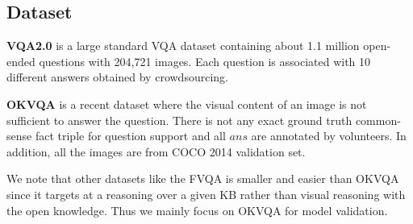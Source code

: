 \documentclass[sigconf]{acmart}
\newcommand{\cjy}[1]{{\color{black}#1}}
\begin{document}
\subsection{Dataset}

\noindent\textbf{VQA2.0}
\citep{antol2015vqa} is a large standard VQA dataset containing about 1.1 million open-ended questions with 204,721 images. Each question is associated with 10 different answers obtained by \cjy{crowdsourcing}.

\noindent\textbf{OKVQA}
\cite{DBLP:conf/cvpr/MarinoRFM19} is a recent dataset where the visual content of \cjy{an} image is not sufficient to answer the question. There is not any exact ground truth common-sense fact triple for question support and all $ans$ are annotated by volunteers. In addition, all the images are from COCO 2014 validation set.

We note that other datasets like the FVQA \cite{DBLP:journals/pami/WangWSDH18} is smaller and easier than OKVQA since it targets at a reasoning over a given KB rather than visual reasoning with the open knowledge. Thus we mainly focus on OKVQA for model validation.
\end{document}
